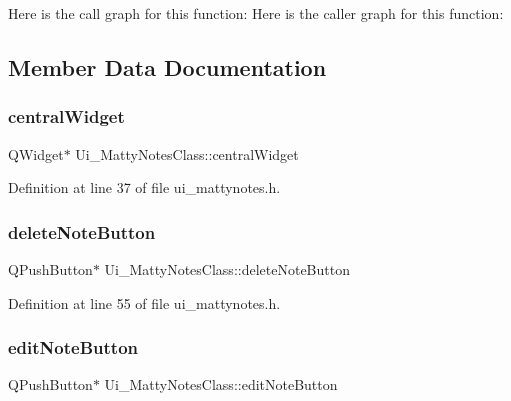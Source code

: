 Here is the call graph for this function\+:
Here is the caller graph for this function\+:


\subsection{Member Data Documentation}
\hypertarget{classUi__MattyNotesClass_a2f1ad89276475aadfc0c1be6d8f387eb}{}\label{classUi__MattyNotesClass_a2f1ad89276475aadfc0c1be6d8f387eb} 
\subsubsection{\texorpdfstring{central\+Widget}{centralWidget}}
{\footnotesize\ttfamily Q\+Widget$\ast$ Ui\+\_\+\+Matty\+Notes\+Class\+::central\+Widget}



Definition at line 37 of file ui\+\_\+mattynotes.\+h.

\hypertarget{classUi__MattyNotesClass_ad921ff558d332e85a8b8ca56953ced43}{}\label{classUi__MattyNotesClass_ad921ff558d332e85a8b8ca56953ced43} 
\subsubsection{\texorpdfstring{delete\+Note\+Button}{deleteNoteButton}}
{\footnotesize\ttfamily Q\+Push\+Button$\ast$ Ui\+\_\+\+Matty\+Notes\+Class\+::delete\+Note\+Button}



Definition at line 55 of file ui\+\_\+mattynotes.\+h.

\hypertarget{classUi__MattyNotesClass_ab58c2780261a9be6d5ee1baae1743c4a}{}\label{classUi__MattyNotesClass_ab58c2780261a9be6d5ee1baae1743c4a} 
\subsubsection{\texorpdfstring{edit\+Note\+Button}{editNoteButton}}
{\footnotesize\ttfamily Q\+Push\+Button$\ast$ Ui\+\_\+\+Matty\+Notes\+Class\+::edit\+Note\+Button}



